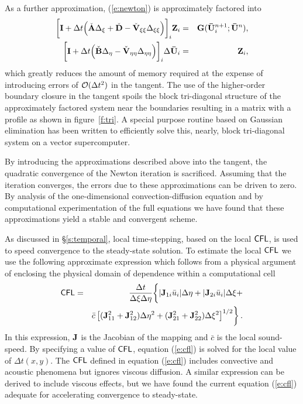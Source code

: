 As a further approximation, (\ref{e:newton}) is approximately factored into
%
\begin{eqnarray}
  \bigg[ {\bf I} + \Delta t \Big ( \check{{\bf A}} \Delta_{\xi} + \check{{\bf D}} - 
                               \check{\bf V}_{\xi\xi} \Delta_{\xi\xi} 
  \Big) \bigg]_{i} {\bf Z}_{i} &=& {\bf G}({\bf \bar U}^{n+1}_{i};{\bf \bar U}^{n}) , \\
  \bigg[ {\bf I} + \Delta t \Big ( \check{{\bf B}} \Delta_{\eta} - 
                                   \check{\bf V}_{\eta\eta} \Delta_{\eta\eta}
  \Big) \bigg]_{i} \Delta {\bf \bar U}_{i} &=& {\bf Z}_{i} , 
\end{eqnarray}
%
which greatly reduces the amount of memory required at the expense of
introducing errors of ${\cal O}(\Delta t^2)$ in the tangent.  The use of the
higher-order boundary closure in the tangent spoils the block tri-diagonal
structure of the approximately factored system near the boundaries resulting
in a matrix with a profile as shown in figure~\ref{f:tri}.  A special purpose
routine based on Gaussian elimination \cite{GoLo:89} has been written to
efficiently solve this, nearly, block tri-diagonal system on a vector
supercomputer.

By introducing the approximations described above into the tangent, the
quadratic convergence of the Newton iteration is sacrificed.  Assuming that
the iteration converges, the errors due to these approximations can be driven
to zero.  By analysis of the one-dimensional convection-diffusion equation and
by computational experimentation of the full equations we have found that
these approximations yield a stable and convergent scheme.

As discussed in \S\ref{s:temporal}, local time-stepping, based on the local
${\sf CFL}$, is used to speed convergence to the steady-state solution.  To
estimate the local ${\sf CFL}$ we use the following approximate expression
\cite{Pulliam:94} which follows from a physical argument of enclosing the
physical domain of dependence within a computational cell \cite{MacCormack:88}
%
\begin{eqnarray} \label{e:cfl}
{\sf CFL} &=& \frac{\Delta t}{\Delta\xi \Delta\eta}
         \biggl\{ |{\bf J}_{1i} \bar u_i| \Delta\eta + 
                  |{\bf J}_{2i} \bar u_i| \Delta\xi +  \nonumber \\
  & &   \bar c \left[ ( {\bf J}_{11}^2 + {\bf J}_{12}^2 ) \Delta\eta^2 + 
                 ( {\bf J}_{21}^2 + {\bf J}_{22}^2 ) \Delta\xi^2  
          \right]^{1/2} \biggr\} {\, .}
\end{eqnarray}
%
In this expression, ${\bf J}$ is the Jacobian of the mapping and $\bar c$ is
the local sound-speed.  By specifying a value of ${\sf CFL}$, equation
(\ref{e:cfl}) is solved for the local value of $\Delta t(x,y)$.  The ${\sf CFL}$
defined in equation (\ref{e:cfl}) includes convective and acoustic phenomena
but ignores viscous diffusion.  A similar expression can be derived to include
viscous effects, but we have found the current equation (\ref{e:cfl}) adequate
for accelerating convergence to steady-state.

